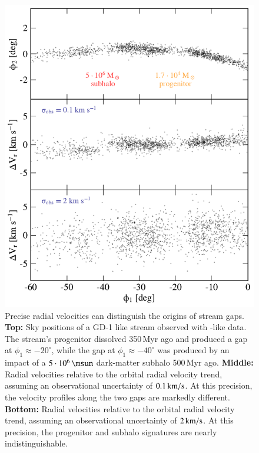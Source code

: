 \documentclass[final,5p,times,twocolumn,authoryear]{elsarticle}
\begin{document}
\begin{figure}[t!]
\begin{center}
\includegraphics[width=\columnwidth]{figures/rv_signal.pdf}
\end{center}
\caption{%
Precise radial velocities can distinguish the origins of stream gaps.
\textbf{Top:} Sky positions of a GD-1 like stream observed with \gaia-like data.
The stream's progenitor dissolved 350\,Myr ago and produced a gap at $\phi_1\approx-20^\circ$, while the gap at $\phi_1\approx-40^\circ$ was produced by an impact of a $5\cdot10^6\,\unit{\msun}$ dark-matter subhalo 500\,Myr ago.
\textbf{Middle:} Radial velocities relative to the orbital radial velocity trend, assuming an observational uncertainty of $0.1\,\unit{\kms}$.
At this precision, the velocity profiles along the two gaps are markedly different.
\textbf{Bottom:} Radial velocities relative to the orbital radial velocity trend, assuming an observational uncertainty of $2\,\unit{\kms}$.
At this precision, the progenitor and subhalo signatures are nearly indistinguishable.
}
\label{fig:rv_signal}
\end{figure}
\end{document}
